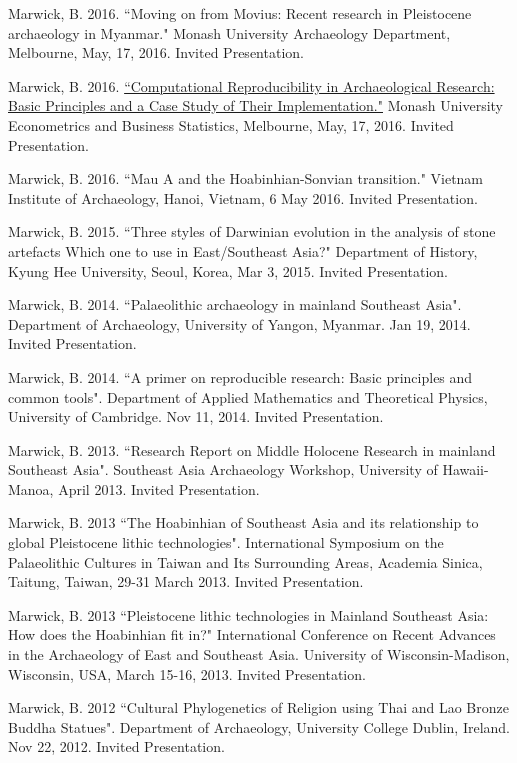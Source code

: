 \ind Marwick, B. 2016. ``Moving on from Movius: Recent research in Pleistocene archaeology in Myanmar." Monash University Archaeology Department, Melbourne, May, 17, 2016. Invited Presentation.

\ind Marwick, B. 2016. \href{https://github.com/benmarwick/Monash-Wombat-2016-talk}{``Computational Reproducibility in Archaeological Research: Basic Principles and a Case Study of Their Implementation."} Monash University Econometrics and Business Statistics, Melbourne, May, 17, 2016. Invited Presentation.

\ind Marwick, B. 2016. ``Mau A and the Hoabinhian-Sonvian transition." Vietnam Institute of Archaeology, Hanoi, Vietnam, 6 May 2016. Invited Presentation.

\ind Marwick, B. 2015. ``Three styles of Darwinian evolution in the analysis of stone artefacts Which one to use in East/Southeast Asia?" Department of History, Kyung Hee University, Seoul, Korea, Mar 3, 2015. Invited Presentation.

\ind Marwick, B. 2014. ``Palaeolithic archaeology in mainland Southeast Asia". Department of Archaeology, University of Yangon, Myanmar. Jan 19, 2014. Invited Presentation.

\ind Marwick, B. 2014. ``A primer on reproducible research: Basic principles and common tools". Department of Applied Mathematics and Theoretical Physics, University of Cambridge. Nov 11, 2014. Invited Presentation.

\ind Marwick, B. 2013. ``Research Report on Middle Holocene Research in mainland Southeast Asia". Southeast Asia Archaeology Workshop, University of Hawaii-Manoa, April 2013. Invited Presentation.

\ind Marwick, B. 2013 ``The Hoabinhian of Southeast Asia and its relationship to global Pleistocene lithic technologies". International Symposium on the Palaeolithic Cultures in Taiwan and Its Surrounding Areas, Academia Sinica, Taitung, Taiwan, 29-31 March 2013.  Invited Presentation.

\ind Marwick, B. 2013 ``Pleistocene lithic technologies in Mainland Southeast Asia: How does the Hoabinhian fit in?"  International Conference on Recent Advances in the Archaeology of East and Southeast Asia. University of Wisconsin-Madison, Wisconsin, USA, March 15-16, 2013. Invited Presentation.

\ind Marwick, B. 2012 ``Cultural Phylogenetics of Religion using Thai and Lao Bronze Buddha Statues". Department of Archaeology, University College Dublin, Ireland. Nov 22, 2012. Invited Presentation.

